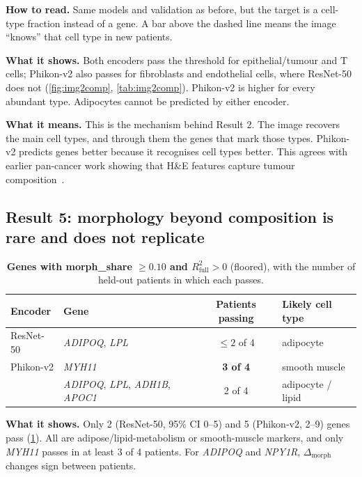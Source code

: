 \documentclass[11pt,a4paper]{article}
\newcommand{\Rf}{R^2_{\mathrm{full}}}
\newcommand{\dm}{\Delta_{\mathrm{morph}}}
\begin{document}
\noindent\textbf{How to read.} Same models and validation as before, but the target is a cell-type fraction instead of a gene. A bar above the dashed line means the image ``knows'' that cell type in new patients.

\smallskip\noindent\textbf{What it shows.} Both encoders pass the threshold for epithelial/tumour and T cells; Phikon-v2 also passes for fibroblasts and endothelial cells, where ResNet-50 does not (\cref{fig:img2comp}, \cref{tab:img2comp}). Phikon-v2 is higher for every abundant type. Adipocytes cannot be predicted by either encoder.

\smallskip\noindent\textbf{What it means.} This is the mechanism behind Result 2. The image recovers the main cell types, and through them the genes that mark those types. Phikon-v2 predicts genes better because it recognises cell types better. This agrees with earlier pan-cancer work showing that H\&E features capture tumour composition~\cite{fu2020pancancer}.

\subsection{Result 5: morphology beyond composition is rare and does not replicate}

\begin{table}[h]
\centering
\caption{\textbf{Genes with morph\_share $\ge0.10$ and $\Rf>0$} (floored), with the number of held-out patients in which each passes.}
\label{tab:morph}
\small\setlength{\tabcolsep}{4pt}
\begin{tabular}{llcl}
\toprule
Encoder & Gene & Patients passing & Likely cell type \\
\midrule
ResNet-50 & \textit{ADIPOQ}, \textit{LPL} & $\le 2$ of 4 & adipocyte \\
\midrule
Phikon-v2 & \textit{MYH11} & \textbf{3 of 4} & smooth muscle \\
          & \textit{ADIPOQ}, \textit{LPL}, \textit{ADH1B}, \textit{APOC1} & 2 of 4 & adipocyte / lipid \\
\bottomrule
\end{tabular}
\end{table}

\noindent\textbf{What it shows.} Only 2 (ResNet-50, 95\% CI 0--5) and 5 (Phikon-v2, 2--9) genes pass (\cref{tab:morph}). All are adipose/lipid-metabolism or smooth-muscle markers, and only \textit{MYH11} passes in at least 3 of 4 patients. For \textit{ADIPOQ} and \textit{NPY1R}, $\dm$ changes sign between patients.
\end{document}

